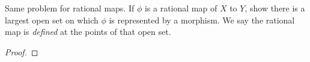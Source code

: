 \label{1.4.2}

Same problem for rational maps. If $\phi$ is a rational map of $X$ to $Y$, show there is a largest open set on which $\phi$ is represented by a morphism. We say the rational map is \emph{defined} at the points of that open set.

\begin{proof}

\end{proof}
